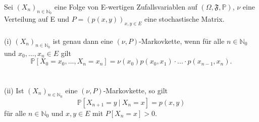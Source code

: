 \label{Besitzen Markovketten die Markoveigenschaft}
Sei ${(X_{n})}_{n \in \mathbb{N}_{0}}$ eine Folge von E-wertigen Zufallsvariablen auf $(\Omega, \mathfrak{F}, \mathbb{P})$, $\nu$ eine Verteilung auf E und $P = (p(x,y))_{x,y \in E}$ eine stochastische Matrix.
\\
\\
(i) ${(X_{n})}_{n \in \mathbb{N}_{0}}$ ist genau dann eine $(\nu,P)$-Markovkette, wenn für alle $n \in \mathbb{N}_{0}$  und $x_{0},...,x_{n} \in E$ gilt
\begin{equation*}
\mathbb{P}[X_{0} = x_{0},...,X_{n} = x_{n}] = \nu(x_{0}) p(x_{0},x_{1}) \cdot ...\cdot p(x_{n-1},x_{n}).
\end{equation*}
\\
\\
(ii) Ist ${(X_{n})}_{n \in \mathbb{N}_{0}}$ eine $(\nu,P)$-Markovkette, so gilt
\begin{equation*}
\mathbb{P}[X_{n+1} = y \: | \: X_{n} = x] = p(x,y)
\end{equation*} 
für alle $n \in \mathbb{N}_{0}$ und $x,y \in E$ mit $P[X_{n} = x]>0$.